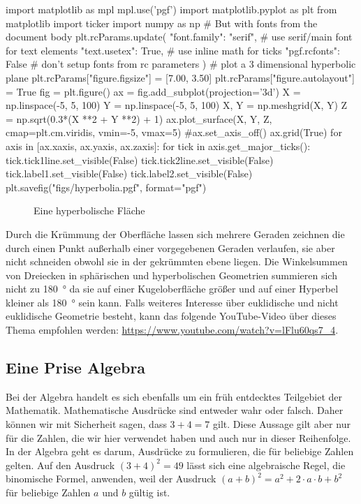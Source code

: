 \begin{pycode}
import matplotlib as mpl
mpl.use('pgf')
import matplotlib.pyplot as plt
from matplotlib import ticker
import numpy as np
# But with fonts from the document body
plt.rcParams.update({
	"font.family": "serif",  # use serif/main font for text elements
	"text.usetex": True,     # use inline math for ticks
	"pgf.rcfonts": False     # don't setup fonts from rc parameters
	})
# plot a 3 dimensional hyperbolic plane
plt.rcParams["figure.figsize"] = [7.00, 3.50]
plt.rcParams["figure.autolayout"] = True
fig = plt.figure()
ax = fig.add_subplot(projection='3d')
X = np.linspace(-5, 5, 100)
Y = np.linspace(-5, 5, 100)
X, Y = np.meshgrid(X, Y)
Z = np.sqrt(0.3*(X **2 + Y **2) + 1)
ax.plot_surface(X, Y, Z, cmap=plt.cm.viridis, vmin=-5, vmax=5)
#ax.set_axis_off()
ax.grid(True)
for axis in [ax.xaxis, ax.yaxis, ax.zaxis]:
	for tick in axis.get_major_ticks():
		tick.tick1line.set_visible(False)
		tick.tick2line.set_visible(False)
		tick.label1.set_visible(False)
		tick.label2.set_visible(False)
plt.savefig("figs/hyperbolia.pgf", format="pgf")
\end{pycode}
\begin{figure}[h]
	\centering
	\makeatletter
	\makeatother
	\caption{Eine hyperbolische Fläche}
	\label{fig:nicht-euklidiche-Hyperbelfläche}
\end{figure}

Durch die Krümmung der Oberfläche lassen sich mehrere Geraden zeichnen die durch einen Punkt außerhalb einer vorgegebenen Geraden verlaufen, sie aber nicht schneiden obwohl sie in der gekrümmten ebene liegen. Die Winkelsummen von Dreiecken in sphärischen und hyperbolischen Geometrien summieren sich nicht zu \SI{180}{\degree} da sie auf einer Kugeloberfläche größer und auf einer Hyperbel kleiner als \SI{180}{\degree} sein kann. Falls weiteres Interesse über euklidische und nicht euklidische Geometrie besteht, kann das folgende YouTube-Video über dieses Thema empfohlen werden: \url{https://www.youtube.com/watch?v=lFlu60qs7_4}.

\subsection{Eine Prise Algebra}

Bei der Algebra handelt es sich ebenfalls um ein früh entdecktes Teilgebiet der Mathematik. Mathematische Ausdrücke sind entweder wahr oder falsch. Daher können wir mit Sicherheit sagen, dass $3 + 4 = 7$ gilt. Diese Aussage gilt aber nur für die Zahlen, die wir hier verwendet haben und auch nur in dieser Reihenfolge. In der Algebra geht es darum, Ausdrücke zu formulieren, die für beliebige Zahlen gelten. Auf den Ausdruck $(3 + 4)^2 = 49$ lässt sich eine algebraische Regel, die binomische Formel, anwenden, weil der Ausdruck $(a + b)^2 = a^2 + 2 \cdot a \cdot b + b^2$ für beliebige Zahlen $a$ und $b$ gültig ist.

